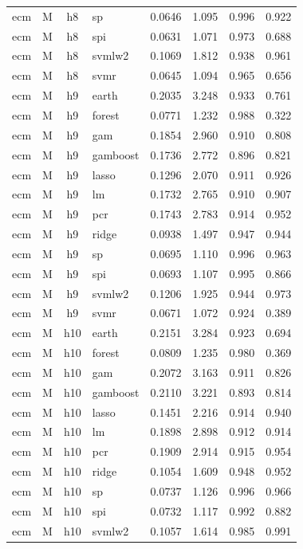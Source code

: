 \begin{ThreePartTable}
\begin{longtable}[t]{llclcccc}
ecm & M & h8 & sp & 0.0646 & 1.095 & 0.996 & 0.922\\
ecm & M & h8 & spi & 0.0631 & 1.071 & 0.973 & 0.688\\
ecm & M & h8 & svmlw2 & 0.1069 & 1.812 & 0.938 & 0.961\\
ecm & M & h8 & svmr & 0.0645 & 1.094 & 0.965 & 0.656\\
\addlinespace
ecm & M & h9 & earth & 0.2035 & 3.248 & 0.933 & 0.761\\
ecm & M & h9 & forest & 0.0771 & 1.232 & 0.988 & 0.322\\
ecm & M & h9 & gam & 0.1854 & 2.960 & 0.910 & 0.808\\
ecm & M & h9 & gamboost & 0.1736 & 2.772 & 0.896 & 0.821\\
ecm & M & h9 & lasso & 0.1296 & 2.070 & 0.911 & 0.926\\
ecm & M & h9 & lm & 0.1732 & 2.765 & 0.910 & 0.907\\
ecm & M & h9 & pcr & 0.1743 & 2.783 & 0.914 & 0.952\\
ecm & M & h9 & ridge & 0.0938 & 1.497 & 0.947 & 0.944\\
ecm & M & h9 & sp & 0.0695 & 1.110 & 0.996 & 0.963\\
ecm & M & h9 & spi & 0.0693 & 1.107 & 0.995 & 0.866\\
ecm & M & h9 & svmlw2 & 0.1206 & 1.925 & 0.944 & 0.973\\
ecm & M & h9 & svmr & 0.0671 & 1.072 & 0.924 & 0.389\\
\addlinespace
ecm & M & h10 & earth & 0.2151 & 3.284 & 0.923 & 0.694\\
ecm & M & h10 & forest & 0.0809 & 1.235 & 0.980 & 0.369\\
ecm & M & h10 & gam & 0.2072 & 3.163 & 0.911 & 0.826\\
ecm & M & h10 & gamboost & 0.2110 & 3.221 & 0.893 & 0.814\\
ecm & M & h10 & lasso & 0.1451 & 2.216 & 0.914 & 0.940\\
ecm & M & h10 & lm & 0.1898 & 2.898 & 0.912 & 0.914\\
ecm & M & h10 & pcr & 0.1909 & 2.914 & 0.915 & 0.954\\
ecm & M & h10 & ridge & 0.1054 & 1.609 & 0.948 & 0.952\\
ecm & M & h10 & sp & 0.0737 & 1.126 & 0.996 & 0.966\\
ecm & M & h10 & spi & 0.0732 & 1.117 & 0.992 & 0.882\\
ecm & M & h10 & svmlw2 & 0.1057 & 1.614 & 0.985 & 0.991\\

\end{longtable}
\end{ThreePartTable}
